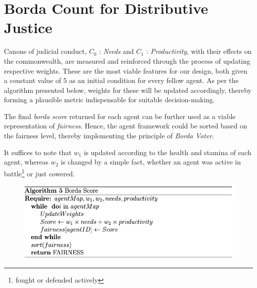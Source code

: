 
\clearpage

\section{Borda Count for Distributive Justice }

Canons of judicial conduct, $C_0$ : \textit{Needs} and $C_1$ : \textit{Productivity}, with their effects on the commonwealth, are measured and reinforced through the process of updating respective weights. These are the most viable features for our design, both given a constant value of 5 as an initial condition for every fellow agent. As per the algorithm presented below, weights for these will be updated accordingly, thereby forming a plausible metric indispensable for suitable decision-making.

The final \textit{borda score} returned for each agent can be further used as a viable representation of \textit{fairness}. Hence, the agent framework could be sorted based on the fairness level, thereby implementing the principle of \textit{Borda Voter}.

It suffices to note that $w_1$ is updated according to the health and stamina of each agent, whereas $w_2$ is changed by a simple fact, whether an agent was active in battle\footnote{fought or defended actively} or just cowered.


\begin{figure}[htb]
    \centering
    \includegraphics[scale=0.7]{006_team_3_agent_design/FIGS/Algo5.png}
    \label{fig:algo5}
\end{figure}


